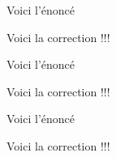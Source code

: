 \documentclass[12pt,oneside]{report}
\newcommand{\exoun}{3\,} %
\newcommand{\exodeux}{2\,} %
\newcommand{\exotrois}{5\,} %
\begin{document}
\begin{spacing}{1.2}
\label{exo1}
\begin{Exercice}[(\exoun points)]%
\begin{Enonce}
Voici l'énoncé
\end{Enonce}

\begin{Correction}
Voici la correction !!!
\end{Correction}
\end{Exercice}

\label{exo2}
\medskip
\begin{Exercice}[(\exodeux points)]%
\begin{Enonce}
Voici l'énoncé
\end{Enonce}

\begin{Correction}
Voici la correction !!!
\end{Correction}
\end{Exercice}

\label{exo3}
\begin{Exercice}[(\exotrois points)]%
\begin{Enonce}
Voici l'énoncé
\end{Enonce}

\begin{Correction}
Voici la correction !!!
\end{Correction}
\end{Exercice}


\end{spacing}
\end{document}
